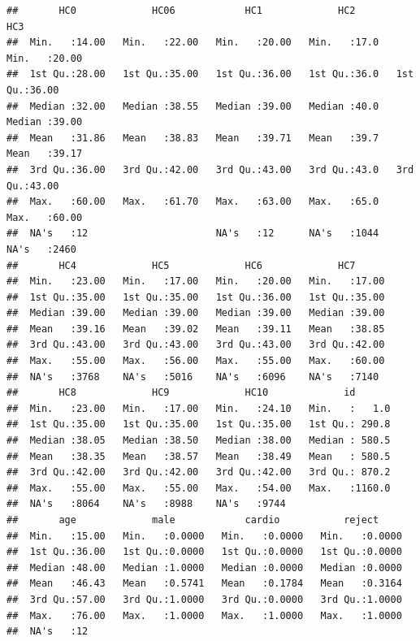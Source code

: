 \documentclass[
]{article}
\newenvironment{Shaded}{\begin{snugshade}}{\end{snugshade}}
\newcommand{\FunctionTok}[1]{\textcolor[rgb]{0.00,0.00,0.00}{#1}}
\newcommand{\NormalTok}[1]{#1}
\newcommand{\SpecialCharTok}[1]{\textcolor[rgb]{0.00,0.00,0.00}{#1}}
\begin{document}
\begin{verbatim}
##       HC0             HC06            HC1             HC2            HC3       
##  Min.   :14.00   Min.   :22.00   Min.   :20.00   Min.   :17.0   Min.   :20.00  
##  1st Qu.:28.00   1st Qu.:35.00   1st Qu.:36.00   1st Qu.:36.0   1st Qu.:36.00  
##  Median :32.00   Median :38.55   Median :39.00   Median :40.0   Median :39.00  
##  Mean   :31.86   Mean   :38.83   Mean   :39.71   Mean   :39.7   Mean   :39.17  
##  3rd Qu.:36.00   3rd Qu.:42.00   3rd Qu.:43.00   3rd Qu.:43.0   3rd Qu.:43.00  
##  Max.   :60.00   Max.   :61.70   Max.   :63.00   Max.   :65.0   Max.   :60.00  
##  NA's   :12                      NA's   :12      NA's   :1044   NA's   :2460   
##       HC4             HC5             HC6             HC7       
##  Min.   :23.00   Min.   :17.00   Min.   :20.00   Min.   :17.00  
##  1st Qu.:35.00   1st Qu.:35.00   1st Qu.:36.00   1st Qu.:35.00  
##  Median :39.00   Median :39.00   Median :39.00   Median :39.00  
##  Mean   :39.16   Mean   :39.02   Mean   :39.11   Mean   :38.85  
##  3rd Qu.:43.00   3rd Qu.:43.00   3rd Qu.:43.00   3rd Qu.:42.00  
##  Max.   :55.00   Max.   :56.00   Max.   :55.00   Max.   :60.00  
##  NA's   :3768    NA's   :5016    NA's   :6096    NA's   :7140   
##       HC8             HC9             HC10             id        
##  Min.   :23.00   Min.   :17.00   Min.   :24.10   Min.   :   1.0  
##  1st Qu.:35.00   1st Qu.:35.00   1st Qu.:35.00   1st Qu.: 290.8  
##  Median :38.05   Median :38.50   Median :38.00   Median : 580.5  
##  Mean   :38.35   Mean   :38.57   Mean   :38.49   Mean   : 580.5  
##  3rd Qu.:42.00   3rd Qu.:42.00   3rd Qu.:42.00   3rd Qu.: 870.2  
##  Max.   :55.00   Max.   :55.00   Max.   :54.00   Max.   :1160.0  
##  NA's   :8064    NA's   :8988    NA's   :9744                    
##       age             male            cardio           reject      
##  Min.   :15.00   Min.   :0.0000   Min.   :0.0000   Min.   :0.0000  
##  1st Qu.:36.00   1st Qu.:0.0000   1st Qu.:0.0000   1st Qu.:0.0000  
##  Median :48.00   Median :1.0000   Median :0.0000   Median :0.0000  
##  Mean   :46.43   Mean   :0.5741   Mean   :0.1784   Mean   :0.3164  
##  3rd Qu.:57.00   3rd Qu.:1.0000   3rd Qu.:0.0000   3rd Qu.:1.0000  
##  Max.   :76.00   Max.   :1.0000   Max.   :1.0000   Max.   :1.0000  
##  NA's   :12
\end{verbatim}

\begin{Shaded}
\end{Shaded}
\end{document}
